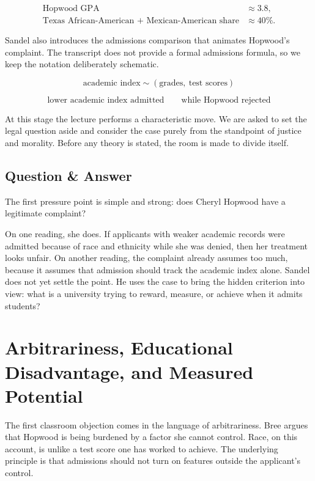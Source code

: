 \begin{align}
\text{Hopwood GPA} &\approx 3.8,\\
\text{Texas African-American + Mexican-American share} &\approx 40\%.
\end{align}

Sandel also introduces the admissions comparison that animates Hopwood's complaint. The transcript does not provide a formal admissions formula, so we keep the notation deliberately schematic.

\begin{equation}
\text{academic index} \sim (\text{grades},\ \text{test scores})
\end{equation}

\begin{equation}
\text{lower academic index admitted}
\qquad
\text{while Hopwood rejected}
\end{equation}

At this stage the lecture performs a characteristic move. We are asked to set the legal question aside and consider the case purely from the standpoint of justice and morality. Before any theory is stated, the room is made to divide itself.

\subsection{Question \& Answer}

The first pressure point is simple and strong: does Cheryl Hopwood have a legitimate complaint?

On one reading, she does. If applicants with weaker academic records were admitted because of race and ethnicity while she was denied, then her treatment looks unfair. On another reading, the complaint already assumes too much, because it assumes that admission should track the academic index alone. Sandel does not yet settle the point. He uses the case to bring the hidden criterion into view: what is a university trying to reward, measure, or achieve when it admits students?

\section{Arbitrariness, Educational Disadvantage, and Measured Potential}

The first classroom objection comes in the language of arbitrariness. Bree argues that Hopwood is being burdened by a factor she cannot control. Race, on this account, is unlike a test score one has worked to achieve. The underlying principle is that admissions should not turn on features outside the applicant's control.

